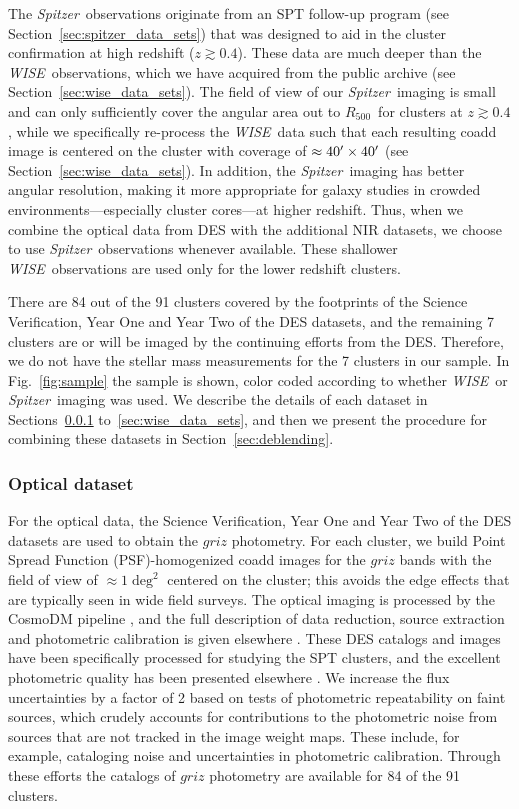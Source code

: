 \documentclass[useAMS,usenatbib,iop,numberedappendix]{mn2e}
\newcommand{\Rfiveoo}{\ensuremath{R_{500}}}
\newcommand{\redshift}{\ensuremath{z}}
\newcommand{\Spitzer}{\emph{Spitzer}}
\newcommand{\WISE}{\emph{WISE}}
\begin{document}
The \Spitzer\ observations originate from an SPT follow-up program (see Section~\ref{sec:spitzer_data_sets}) that was designed to aid in the cluster confirmation at high redshift ($\redshift \gtrsim 0.4$).  These data are much deeper than the \WISE\ observations, which we have acquired from the public archive (see Section~\ref{sec:wise_data_sets}).  The field of view of our \Spitzer\ imaging is small and can only sufficiently cover the angular area out to \Rfiveoo\ for clusters at $\redshift\gtrsim0.4$, while we specifically re-process the \WISE\ data such that each resulting coadd image is centered on the cluster with coverage of $\approx40\hbox{$^\prime$}\times40\hbox{$^\prime$}$ (see Section~\ref{sec:wise_data_sets}).
In addition, the \Spitzer\ imaging has better angular resolution, making it more appropriate for galaxy studies in crowded environments---especially cluster cores---at higher redshift.  Thus, when we combine the optical data from DES with the additional NIR datasets, we choose to use \Spitzer\ observations whenever available.
These shallower \WISE\ observations are used only for the lower redshift clusters.


There are 84 out of the 91 clusters covered by the footprints of the Science Verification, Year One and Year Two of the DES datasets, and the remaining 7 clusters are or will be imaged by the continuing efforts from the DES. 
Therefore, we do not have the stellar mass measurements for the 7 clusters in our sample.
In Fig.~\ref{fig:sample} the sample is shown, color coded according to whether \WISE\ or \Spitzer\ imaging was used. We describe the details of each dataset in Sections~\ref{sec:des_data_sets} to~\ref{sec:wise_data_sets}, and then we present the procedure for combining these datasets in Section~\ref{sec:deblending}.

\subsubsection{Optical dataset}
\label{sec:des_data_sets}

For the optical data, the Science Verification, Year One and Year Two of the DES datasets \citep{diehl16} are used to obtain the $griz$ photometry. 
For each cluster, we build Point Spread Function (PSF)-homogenized coadd images for the $griz$ bands with the field of view of $\approx1\deg^{2}$ centered on the cluster; this avoids the edge effects that are typically seen in wide field surveys.  The optical imaging is processed by the CosmoDM pipeline \citep{mohr12}, and the full description of data reduction, source extraction and photometric calibration is given elsewhere \citep{desai12,liu15b,hennig17}.  These DES catalogs and images have been specifically processed for studying the SPT clusters, and the excellent photometric quality has been presented elsewhere \citep{hennig17,klein17}.  We increase the flux uncertainties by a factor of 2 based on tests of photometric repeatability on faint sources, which crudely accounts for contributions to the photometric noise from sources that are not tracked in the image weight maps.  These include, for example, cataloging noise and uncertainties in photometric calibration.  Through these efforts the catalogs of $griz$ photometry are available for 84 of the 91 clusters.  
\end{document}
